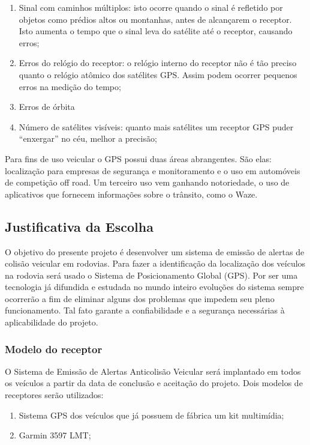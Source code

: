 \begin{enumerate}
  \item Sinal com caminhos múltiplos: isto ocorre quando o sinal é refletido por objetos como prédios altos ou montanhas, antes de alcançarem o receptor. Isto aumenta o tempo que o sinal leva do satélite até o receptor, causando erros;
  \item Erros do relógio do receptor: o relógio interno do receptor não é tão preciso quanto o relógio atômico dos satélites GPS. Assim podem ocorrer pequenos erros na medição do tempo;
  \item  Erros de órbita
  \item Número de satélites visíveis: quanto mais satélites um receptor GPS puder “enxergar” no céu, melhor a precisão;
\end{enumerate}

Para fins de uso veicular o GPS possui duas áreas abrangentes. São elas: localização para empresas de segurança e monitoramento e o uso em automóveis de competição off road. Um terceiro uso vem ganhando notoriedade, o uso de aplicativos que fornecem informações sobre o trânsito, como o Waze.

\subsection{Justificativa da Escolha}

	O objetivo do presente projeto é desenvolver um sistema de emissão de alertas de colisão veicular em rodovias. Para fazer a identificação da localização dos veículos na rodovia será usado o Sistema de Posicionamento Global (GPS). Por ser uma tecnologia já difundida e estudada no mundo inteiro evoluções do sistema sempre ocorrerão a fim de eliminar alguns dos problemas que impedem seu pleno funcionamento. Tal fato garante a confiabilidade e a segurança necessárias à aplicabilidade do projeto.

\subsubsection{Modelo do receptor}
	O Sistema de Emissão de Alertas Anticolisão Veicular será implantado em todos os veículos a partir da data de conclusão e aceitação do projeto. Dois modelos de receptores serão utilizados:

  \begin{enumerate}
    \item Sistema GPS dos veículos que já possuem de fábrica um kit multimídia;
    \item Garmin 3597 LMT;
  \end{enumerate}

